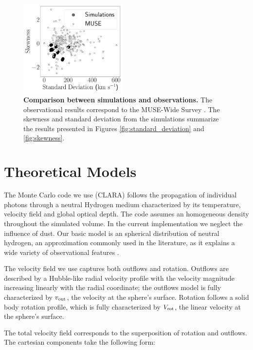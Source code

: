 \documentclass[a4paper,fleqn,usenatbib]{mnras}
\begin{document}
\begin{figure}
\centering
\includegraphics[width=0.48\textwidth]{./figures/results/muse_vs_simulations.pdf}

\caption{\textbf{Comparison between simulations and observations.}  
The observational results correspond to the MUSE-Wide Survey
\citep{2017A&A...606A..12H}. The skewness and standard deviation from
the simulations summarize the results presented in Figures
\ref{fig:standard_deviation} and \ref{fig:skewness}.
  \label{fig:muse}}
\end{figure}


\section{Theoretical Models}
\label{sec:theory}


The Monte Carlo code we use (CLARA) \citep{CLARA} follows the propagation of
individual photons through a neutral Hydrogen medium characterized by
its temperature, velocity field and global optical depth.
The code assumes an homogeneous density throughout the simulated
volume.
In the current implementation we neglect the influence of dust.
Our basic model is an spherical distribution of neutral hydrogen,
an approximation commonly used in the literature, as it explains a
wide variety of observational features
\citep{Ahn03,Verhamme06,Dijkstra06}. 


The velocity field we use captures both outflows and rotation.
Outflows are described by a Hubble-like radial velocity profile with
the velocity magnitude increasing linearly with the radial
coordinate; the outflows model is fully characterized by $v_{\rm out}$, the
velocity at the sphere's surface.
Rotation follows a solid body rotation profile, which is fully
characterized by $V_{\rm rot}$, the linear velocity at the sphere's surface.

The total velocity field corresponds to the superposition of rotation and
outflows.
The cartesian components take the following form:
\end{document}
